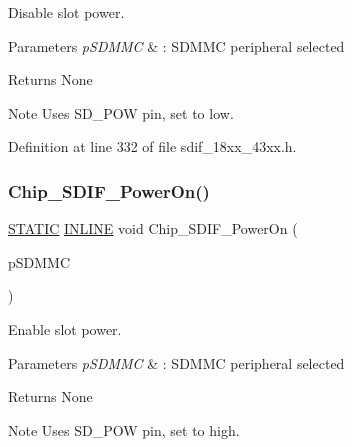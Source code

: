 Disable slot power. 


\begin{DoxyParams}{Parameters}
{\em p\+S\+D\+M\+MC} & \+: S\+D\+M\+MC peripheral selected \\
\hline
\end{DoxyParams}
\begin{DoxyReturn}{Returns}
None 
\end{DoxyReturn}
\begin{DoxyNote}{Note}
Uses S\+D\+\_\+\+P\+OW pin, set to low. 
\end{DoxyNote}


Definition at line 332 of file sdif\+\_\+18xx\+\_\+43xx.\+h.

\mbox{\label{group___s_d_i_f__18_x_x__43_x_x_gac7838809730c5b4c05451c965e11bbd5}} 
\subsubsection{\texorpdfstring{Chip\+\_\+\+S\+D\+I\+F\+\_\+\+Power\+On()}{Chip\_SDIF\_PowerOn()}}
{\footnotesize\ttfamily \hyperlink{group___l_p_c___types___public___macros_ga10b2d890d871e1489bb02b7e70d9bdfb}{S\+T\+A\+T\+IC} \hyperlink{spifi__18xx__43xx_8h_a2eb6f9e0395b47b8d5e3eeae4fe0c116}{I\+N\+L\+I\+NE} void Chip\+\_\+\+S\+D\+I\+F\+\_\+\+Power\+On (\begin{DoxyParamCaption}\item[{\hyperlink{struct_l_p_c___s_d_m_m_c___t}{L\+P\+C\+\_\+\+S\+D\+M\+M\+C\+\_\+T} $\ast$}]{p\+S\+D\+M\+MC }\end{DoxyParamCaption})}



Enable slot power. 


\begin{DoxyParams}{Parameters}
{\em p\+S\+D\+M\+MC} & \+: S\+D\+M\+MC peripheral selected \\
\hline
\end{DoxyParams}
\begin{DoxyReturn}{Returns}
None 
\end{DoxyReturn}
\begin{DoxyNote}{Note}
Uses S\+D\+\_\+\+P\+OW pin, set to high. 
\end{DoxyNote}


